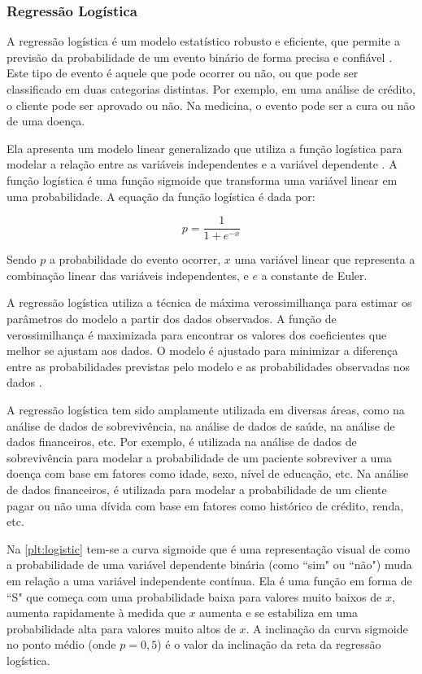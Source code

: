 \subsubsection{Regressão Logística}

A regressão logística é um modelo estatístico robusto e eficiente, que permite a previsão da probabilidade de um evento binário de forma precisa e confiável \citep{hosmer2013applied}. Este tipo de evento é aquele que pode ocorrer ou não, ou que pode ser classificado em duas categorias distintas. Por exemplo, em uma análise de crédito, o cliente pode ser aprovado ou não. Na medicina, o evento pode ser a cura ou não de uma doença.

Ela apresenta um modelo linear generalizado que utiliza a função logística para modelar a relação entre as variáveis independentes e a variável dependente \citep{kleinbaum2010logistic}. A função logística é uma função sigmoide que transforma uma variável linear em uma probabilidade. A equação da função logística é dada por:

\begin{equation}
    p = \frac{1}{1 + e^{-x}}
\end{equation}

Sendo $p$ a probabilidade do evento ocorrer, $x$ uma variável linear que representa a combinação linear das variáveis independentes, e $e$ a constante de Euler.

A regressão logística utiliza a técnica de máxima verossimilhança para estimar os parâmetros do modelo a partir dos dados observados. A função de verossimilhança é maximizada para encontrar os valores dos coeficientes que melhor se ajustam aos dados. O modelo é ajustado para minimizar a diferença entre as probabilidades previstas pelo modelo e as probabilidades observadas nos dados \citep{mccullagh1989generalized}.

A regressão logística tem sido amplamente utilizada em diversas áreas, como na análise de dados de sobrevivência, na análise de dados de saúde, na análise de dados financeiros, etc. Por exemplo, é utilizada na análise de dados de sobrevivência para modelar a probabilidade de um paciente sobreviver a uma doença com base em fatores como idade, sexo, nível de educação, etc. Na análise de dados financeiros, é utilizada para modelar a probabilidade de um cliente pagar ou não uma dívida com base em fatores como histórico de crédito, renda, etc.

Na \autoref{plt:logistic} tem-se a curva sigmoide que é uma representação visual de como a probabilidade de uma variável dependente binária (como ``sim" ou ``não") muda em relação a uma variável independente contínua. Ela é uma função em forma de ``S" que começa com uma probabilidade baixa para valores muito baixos de $x$, aumenta rapidamente à medida que $x$ aumenta e se estabiliza em uma probabilidade alta para valores muito altos de $x$. A inclinação da curva sigmoide no ponto médio (onde $p = 0,5$) é o valor da inclinação da reta da regressão logística.


